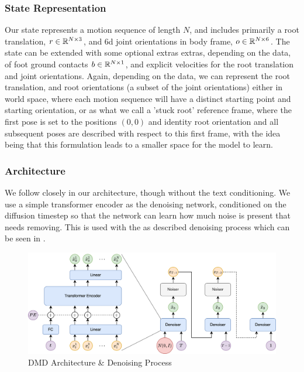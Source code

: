 \subsubsection{State Representation}
Our state represents a motion sequence of length $N$, and includes primarily a root translation, $r \in \mathbb{R}^{N \times 3}$, and 6d \cite{aa_6d_angles} joint orientations in body frame, $o \in \mathbb{R}^{N \times 6}$. The state can be extended with some optional extras extras, depending on the data, of foot ground contacts $b \in \mathbb{R}^{N \times 1}$, and explicit velocities for the root translation and joint orientations. Again, depending on the data, we can represent the root translation, and root orientations (a subset of the joint orientations) either in world space, where each motion sequence will have a distinct starting point and starting orientation, or as what we call a 'stuck root' reference frame, where the first pose is set to the positions $(0,0)$ and identity root orientation and all subsequent poses are described with respect to this first frame, with the idea being that this formulation leads to a smaller space for the model to learn.



\subsubsection{Architecture}
We follow closely \cite{MDM} in our architecture, though without the text conditioning. We use a simple transformer \cite{vaswani2017attention} encoder as the denoising network, conditioned on the diffusion timestep so that the network can learn how much noise is present that needs removing. This is used with the as described denoising process which can be seen in .


\begin{figure}[!ht]
    \centering
    \includegraphics[width=1\textwidth]{Figures/diffusion/Network_diagram.png}
    \caption{DMD Architecture \& Denoising Process}
    \label{fig:dmd_architecture}
\end{figure}



